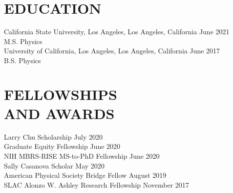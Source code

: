 \documentclass[margin,line]{res}
\let\origsection\section%
\let\section\subsection%
\let\section\origsection%
\begin{document}
\begin{resume}
%

\iffalse
\section{OBJECTIVE}
To pursue a Physics PhD in Quantum Information and Computing.
\fi

\section{\mysidestyle  EDUCATION}
California State University, Los Angeles, Los Angeles, California \hfill June 2021\\
M.S. Physics\\[2.5mm]
%
University of California, Los Angeles, Los Angeles, California \hfill June 2017 \\
B.S. Physics\\[2.5mm]
%

\section{\mysidestyle  FELLOWSHIPS  \\ AND AWARDS}  
Larry Chu Scholarship \hfill July 2020 \\
Graduate Equity Fellowship \hfill June 2020 \\
NIH MBRS-RISE MS-to-PhD Fellowship \hfill June 2020 \\
Sally Casanova Scholar \hfill May 2020 \\
American Physical Society Bridge Fellow \hfill August 2019 \\
SLAC Alonzo W. Ashley Research Fellowship \hfill November 2017 \\


\end{resume}
\end{document}
